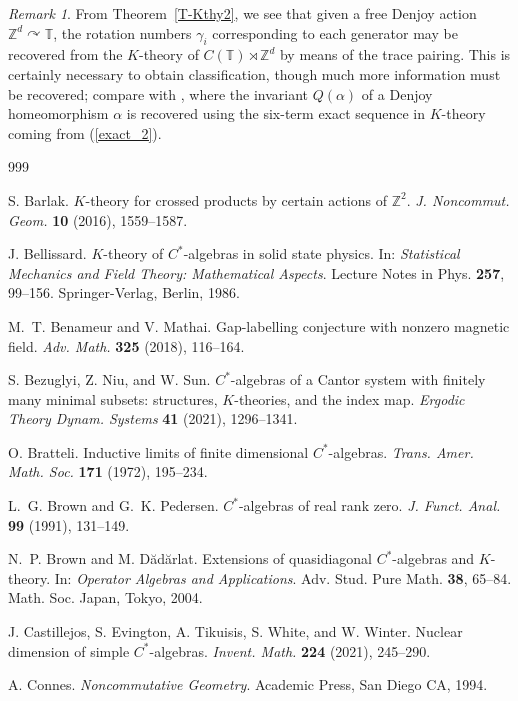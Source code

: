 \documentclass[11pt,a4paper,leqno]{amsart}
\theoremstyle{definition}
\theoremstyle{remark}
\newtheorem{rem}[thm]{Remark}
\numberwithin{equation}{section}
\theoremstyle{plain}
\newcommand{\Zb}{\mathbb{Z}}
\newcommand{\Tb}{\mathbb{T}}
\begin{document}
\begin{rem}
	From Theorem~\ref{T-Kthy2}, we see that given a free Denjoy action $\Zb^d \curvearrowright \Tb$, the rotation numbers $\gamma_i$ corresponding to each generator may be recovered from the $K$-theory of $C(\Tb) \rtimes \Zb^d$ by means of the trace pairing. This is certainly necessary to obtain classification, though much more information must be recovered; compare with \cite{PutSchSka86}, where the invariant $Q(\alpha)$ of a Denjoy homeomorphism $\alpha$ is recovered using the six-term exact sequence in $K$-theory coming from (\ref{exact_2}).
\end{rem}

\begin{thebibliography}{999}

S. Barlak.
$K$-theory for crossed products by certain actions of $\Zb^2$.
{\it J. Noncommut. Geom.} {\bf 10} (2016), 1559--1587.

J. Bellissard.
$K$-theory of $C^*$-algebras in solid state physics.
In: {\it Statistical Mechanics and Field Theory: Mathematical Aspects}.
Lecture Notes in Phys. {\bf 257}, 99--156. Springer-Verlag, Berlin, 1986.

M.~T. Benameur and V. Mathai.
Gap-labelling conjecture with nonzero magnetic field.
{\it Adv. Math.} {\bf 325} (2018), 116--164.

S. Bezuglyi, Z. Niu, and W. Sun.
$C^*$-algebras of a Cantor system with finitely many minimal subsets: structures, $K$-theories, and the index map.
{\it Ergodic Theory Dynam. Systems} {\bf 41} (2021), 1296--1341.

O. Bratteli.
Inductive limits of finite dimensional $C^*$-algebras.
{\it Trans. Amer. Math. Soc.} {\bf 171} (1972), 195--234.

L.~G. Brown and G.~K. Pedersen.
$C^*$-algebras of real rank zero.
{\it J. Funct. Anal.} {\bf 99} (1991), 131--149.

N.~P. Brown and M. Dădărlat.
Extensions of quasidiagonal $C^*$-algebras and $K$-theory.
In: {\it Operator Algebras and Applications}.
Adv. Stud. Pure Math. {\bf 38}, 65--84. Math. Soc.
Japan, Tokyo, 2004.

J. Castillejos, S. Evington, A. Tikuisis, S. White, and W. Winter.
Nuclear dimension of simple $C^*$-algebras.
{\it Invent. Math.} {\bf 224} (2021), 245--290.

A. Connes.
{\it Noncommutative Geometry}.
Academic Press, San Diego CA, 1994.


\end{thebibliography}
\end{document}
